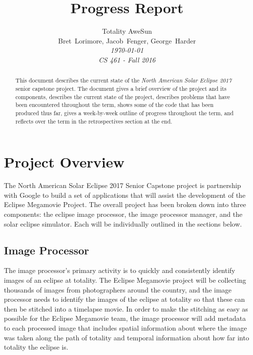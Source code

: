 \documentclass[10pt, onecolumn, draftclsnofoot, letterpaper, compsoc]{IEEEtran}
\title{Progress Report}
\author{Totality AweSun \\
		Bret~Lorimore, Jacob~Fenger, George~Harder \\
		\textit{\today \\
		CS 461 - Fall 2016}}
\begin{document}
\maketitle

\begin{abstract}
This document describes the current state of the \textit{North American Solar Eclipse 2017}
senior capstone project. The document gives a brief overview of the project and its components,
describes the current state of the project, describes problems that have been
encountered throughout the term, shows some of the code that has been produced thus far, gives
a week-by-week outline of progress throughout the term, and reflects over the term in the 
retrospectives section at the end.
\end{abstract}

\newpage

\tableofcontents

\newpage

\section{Project Overview}

The North American Solar Eclipse 2017 Senior Capstone project is partnership
with Google to build a set of applications that will assist the development of
the Eclipse Megamovie Project. The overall project has been broken down into
three components: the eclipse image processor, the image processor manager, and
the solar eclipse simulator. Each will be individually outlined in the sections
below.

\subsection{Image Processor}

The image processor’s primary activity is to quickly and consistently identify
images of an eclipse at totality. The Eclipse Megamovie project will be
collecting thousands of images from photographers around the country, and the
image processor needs to identify the images of the eclipse at totality so that
these can then be stitched into a timelapse movie. In order to make the
stitching as easy as possible for the Eclipse Megamovie team, the image
processor will add metadata to each processed image that includes spatial
information about where the image was taken along the path of totality and
temporal information about how far into totality the eclipse is.
\end{document}
